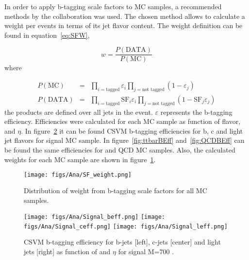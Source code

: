 In order to apply b-tagging scale factors to MC samples, a recommended methods by the collaboration was used. The chosen method allows to calculate a weight per events in terms of its jet flavor content. The weight definition can be found in equation~\ref{eq:SFW}, 

\begin{equation}
  \label{eq:SFW}
  w=\frac{P(\text{DATA})}{P(\text{MC})}
\end{equation}where

\begin{eqnarray}
  \label{eq:DataMCSFP}
  P(\text{MC}) & = & \prod_{i=\text{tagged}} \varepsilon_i \prod_{j=\text{not tagged}} (1-\varepsilon_j) \\
  P(\text{DATA}) & = & \prod_{i=\text{tagged}} \text{SF}_i \varepsilon_i \prod_{j=\text{not tagged}} (1-\text{SF}_j \varepsilon_j)
\end{eqnarray}the products are defined over all jets in the event. $\varepsilon$ represents the b-tagging efficiency. Efficiencies were calculated for each MC sample as function of flavor, \pt and $\eta$. In figure~\ref{fig:SignalBEff} it can be found CSVM b-tagging efficiencies for b, c and light jet flavors for signal MC sample. In figure~\ref{fig:ttbarBEff} and~\ref{fig:QCDBEff} can be found the same efficiencies for \ttbar and QCD MC samples. Also, the calculated weights for each MC sample are shown in figure~\ref{fig:SFweight}. 

\begin{figure}[!Hhtbp]
  \begin{center}
    \texttt{[image: figs/Ana/SF\_weight.png]}
    \caption{Distribution of weight from b-tagging scale factors for all MC samples.}
    \label{fig:SFweight}
  \end{center}
\end{figure}

\begin{figure}[!Hhtbp]
  \begin{center}
    \texttt{[image: figs/Ana/Signal\_beff.png]}
    \texttt{[image: figs/Ana/Signal\_ceff.png]}
    \texttt{[image: figs/Ana/Signal\_leff.png]}
    \caption{CSVM b-tagging efficiency for b-jets [left], c-jets [center] and light jets [right] as function of \pt and $\eta$ for signal M=700 \GeVcc.}
    \label{fig:SignalBEff}
  \end{center}
\end{figure}

